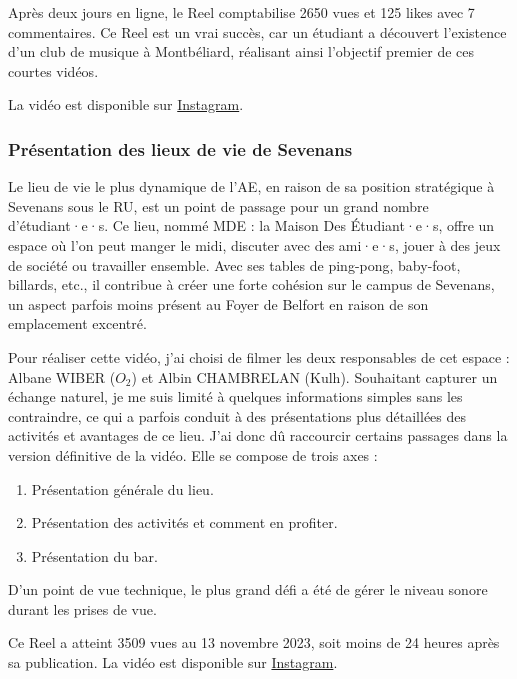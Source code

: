 Après deux jours en ligne, le Reel comptabilise 2650 vues et 125 likes avec 7 commentaires.
Ce Reel est un vrai succès, car un étudiant a découvert l'existence d'un club de musique à Montbéliard, réalisant ainsi l'objectif premier de ces courtes vidéos.

La vidéo est disponible sur \href{https://www.instagram.com/reel/CyEDJKTspWL/?utm_source=ig_web_copy_link&igshid=MzRlODBiNWFlZA==}{Instagram}.


\subsubsection{Présentation des lieux de vie de Sevenans}\label{subsubsec:MDE}

Le lieu de vie le plus dynamique de l'\gls{AE}, en raison de sa position stratégique à Sevenans sous le RU, est un point de passage pour un grand nombre d'étudiant·e·s.
Ce lieu, nommé MDE : la Maison Des Étudiant·e·s, offre un espace où l'on peut manger le midi, discuter avec des ami·e·s, jouer à des jeux de société ou travailler ensemble.
Avec ses tables de ping-pong, baby-foot, billards, etc., il contribue à créer une forte cohésion sur le campus de Sevenans, un aspect parfois moins présent au Foyer de Belfort en raison de son emplacement excentré.

Pour réaliser cette vidéo, j'ai choisi de filmer les deux responsables de cet espace : Albane WIBER ($O_2$) et Albin CHAMBRELAN (Kulh).
Souhaitant capturer un échange naturel, je me suis limité à quelques informations simples sans les contraindre, ce qui a parfois conduit à des présentations plus détaillées des activités et avantages de ce lieu.
J'ai donc dû raccourcir certains passages dans la version définitive de la vidéo.
Elle se compose de trois axes :
\begin{enumerate}
    \item Présentation générale du lieu.
    \item Présentation des activités et comment en profiter.
    \item Présentation du bar.
\end{enumerate}

D'un point de vue technique, le plus grand défi a été de gérer le niveau sonore durant les prises de vue.

Ce Reel a atteint 3509 vues au 13 novembre 2023, soit moins de 24 heures après sa publication.
La vidéo est disponible sur \href{https://www.instagram.com/reel/CzjfX8Xs5X1/?utm_source=ig_web_copy_link&igshid=MzRlODBiNWFlZA==}{Instagram}.

